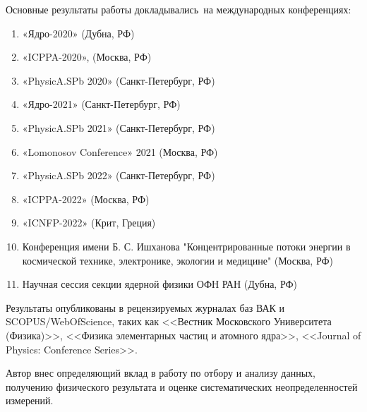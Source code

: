 {\probation}
Основные результаты работы докладывались~на международных конференциях:
\begin{enumerate}[beginpenalty=10000] %
	\item «Ядро-2020» (Дубна, РФ)
	\item «ICPPA-2020», (Москва, РФ)	
	\item «PhysicA.SPb 2020» (Санкт-Петербург, РФ)
	\item «Ядро-2021» (Санкт-Петербург, РФ)
	\item «PhysicA.SPb 2021» (Санкт-Петербург, РФ)
	\item «Lomonosov Conference» 2021 (Москва, РФ)
	\item «PhysicA.SPb 2022» (Санкт-Петербург, РФ)
	\item «ICPPA-2022» (Москва, РФ)
	\item «ICNFP-2022» (Крит, Греция)
	\item Конференция имени Б. С. Ишханова "Концентрированные потоки энергии в космической технике, электронике, экологии и медицине" (Москва, РФ)
	\item Научная сессия секции ядерной физики ОФН РАН (Дубна, РФ)
\end{enumerate}
Результаты опубликованы в рецензируемых журналах баз ВАК и SCOPUS/WebOfScience, таких как <<Вестник Московского Университета (Физика)>>, <<Физика элементарных частиц и атомного ядра>>, <<Journal of Physics: Conference Series>>.	

{\contribution} Автор внес определяющий вклад в работу по отбору и анализу данных, получению физического результата и оценке систематических неопределенностей измерений.

